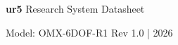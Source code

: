 \documentclass[a4paper,landscape,10pt]{article}
\begin{document}
\noindent
\colorbox{maincolor}{
    \parbox{\dimexpr\linewidth-2\fboxsep}{
        \vspace{8pt}
        
        {\color{white}\Large\textbf{ur5}} \hfill
        {\color{white}\small Research System Datasheet}
        
        \vspace{2pt}
        
        {\color{white}\small Model: OMX-6DOF-R1} \hfill
        {\color{white}\small Rev 1.0 | 2026}
        
        \vspace{8pt}
    }
}
\vspace{0.4cm}
\end{document}
